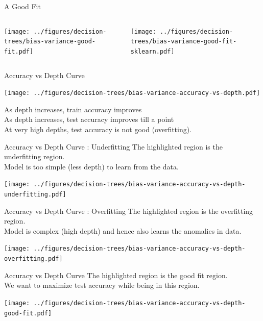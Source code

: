\documentclass[usenames,dvipsnames]{beamer}
\begin{document}
\begin{frame}{A Good Fit}
\begin{columns}
\begin{column}{0.5\textwidth}
\texttt{[image: ../figures/decision-trees/bias-variance-good-fit.pdf]}
\end{column}
\begin{column}{0.5\textwidth}
\texttt{[image: ../figures/decision-trees/bias-variance-good-fit-sklearn.pdf]}
\end{column}
\end{columns}

\end{frame}

\begin{frame}{Accuracy vs Depth Curve}
\begin{center}
\texttt{[image: ../figures/decision-trees/bias-variance-accuracy-vs-depth.pdf]}
\end{center}
\pause As depth increases, train accuracy improves\\
\pause As depth increases, test accuracy improves till a point\\
\pause At very high depths, test accuracy is not good (overfitting). 

\end{frame}

\begin{frame}{Accuracy vs Depth Curve : Underfitting}
The highlighted region is the underfitting region.\\
Model is too simple (less depth) to learn from the data. 
\begin{center}
\texttt{[image: ../figures/decision-trees/bias-variance-accuracy-vs-depth-underfitting.pdf]}
\end{center}
\end{frame}

\begin{frame}{Accuracy vs Depth Curve : Overfitting}
The highlighted region is the overfitting region.\\
Model is complex (high depth) and hence also learns the anomalies in data. 
\begin{center}
\texttt{[image: ../figures/decision-trees/bias-variance-accuracy-vs-depth-overfitting.pdf]}
\end{center}
\end{frame}

\begin{frame}{Accuracy vs Depth Curve }
The highlighted region is the good fit region.\\
We want to maximize test accuracy while being in this region.
\begin{center}
\texttt{[image: ../figures/decision-trees/bias-variance-accuracy-vs-depth-good-fit.pdf]}
\end{center}
\end{frame}
\end{document}
